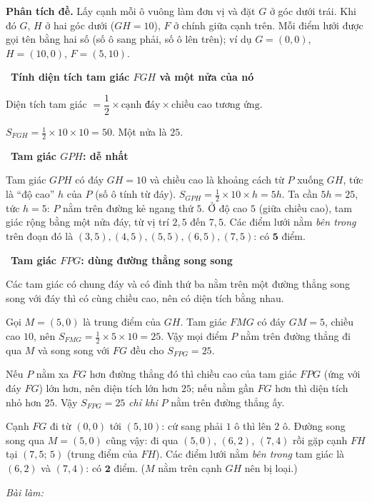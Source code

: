 \documentclass[11pt]{article}
\newif\ifsol \solfalse
\newcommand{\StuProb}[2]{\begin{probboxS}{#1}{#2}\StuProbBody\end{probboxS}}
\newcommand{\probsol}[1]{%
  \begin{lrbox}{\solmeasure}\begin{minipage}{\dimexpr\linewidth-24pt\relax}#1\end{minipage}\end{lrbox}%
  \ifsol
    \begin{solbox}#1\end{solbox}%
  \else
    \setlength{\solht}{\dimexpr\ht\solmeasure+\dp\solmeasure+0.85cm\relax}%
    \ifdim\solht<1.35cm\setlength{\solht}{1.35cm}\fi
    \ifdim\solht>\StudentMaxWork\setlength{\solht}{\StudentMaxWork}\fi
    \par\noindent\begin{minipage}{\linewidth}%
    \expandafter\StuProb\StuProbArgs
    \begin{tcolorbox}[colback=white,colframe=Line,boxrule=0.8pt,arc=5pt,
      left=8pt,right=8pt,top=4pt,bottom=4pt,height=\solht]{\footnotesize\color{Slate}\itshape\WorkWord}\end{tcolorbox}%
    \end{minipage}\par\medskip
  \fi}
\newlength{\StudentMaxWork}\setlength{\StudentMaxWork}{4.5cm}
\newcommand{\step}[2]{\par\smallskip\noindent{\bfseries\color{tmBlue!85!black}\StepWord~#1.}\ {\bfseries #2}\par\nopagebreak}
\def\WorkWord{Bài làm:}
\def\StepWord{Bước}
\begin{document}
\probsol{
\textbf{Phân tích đề.} Lấy cạnh mỗi ô vuông làm đơn vị và đặt $G$ ở góc dưới trái. Khi đó $G$, $H$ ở hai góc dưới
($GH=10$), $F$ ở chính giữa cạnh trên. Mỗi điểm lưới được gọi tên bằng hai số (số ô sang phải, số ô lên trên); ví dụ
$G=(0,0)$, $H=(10,0)$, $F=(5,10)$.

\step{1}{Tính diện tích tam giác $FGH$ và một nửa của nó}
\begin{recallbox}Diện tích tam giác $=\dfrac12\times\text{cạnh đáy}\times\text{chiều cao tương ứng}$.\end{recallbox}
$S_{FGH}=\frac12\times10\times10=50$. Một nửa là $25$.

\step{2}{Tam giác $GPH$: dễ nhất}
Tam giác $GPH$ có đáy $GH=10$ và chiều cao là khoảng cách từ $P$ xuống $GH$, tức là ``độ cao'' $h$ của $P$
(số ô tính từ đáy). $S_{GPH}=\frac12\times10\times h=5h$. Ta cần $5h=25$, tức $h=5$: $P$ nằm trên đường kẻ ngang
thứ $5$. Ở độ cao $5$ (giữa chiều cao), tam giác rộng bằng một nửa đáy, từ vị trí $2{,}5$ đến $7{,}5$. Các điểm lưới
nằm \emph{bên trong} trên đoạn đó là $(3,5),(4,5),(5,5),(6,5),(7,5)$: có $\mathbf{5}$ điểm.

\step{3}{Tam giác $FPG$: dùng đường thẳng song song}
\begin{recallbox}Các tam giác có chung đáy và có đỉnh thứ ba nằm trên một đường thẳng song song với đáy thì có
cùng chiều cao, nên có diện tích bằng nhau.\end{recallbox}
Gọi $M=(5,0)$ là trung điểm của $GH$. Tam giác $FMG$ có đáy $GM=5$, chiều cao $10$, nên $S_{FMG}=\frac12\times5\times10=25$.
Vậy mọi điểm $P$ nằm trên đường thẳng đi qua $M$ và song song với $FG$ đều cho $S_{FPG}=25$.
\begin{proofbox}Nếu $P$ nằm xa $FG$ hơn đường thẳng đó thì chiều cao của tam giác $FPG$ (ứng với đáy $FG$) lớn hơn, nên
diện tích lớn hơn $25$; nếu nằm gần $FG$ hơn thì diện tích nhỏ hơn $25$. Vậy $S_{FPG}=25$ \emph{chỉ khi} $P$ nằm trên
đường thẳng ấy.\end{proofbox}
Cạnh $FG$ đi từ $(0,0)$ tới $(5,10)$: cứ sang phải $1$ ô thì lên $2$ ô. Đường song song qua $M=(5,0)$ cũng vậy:
đi qua $(5,0)$, $(6,2)$, $(7,4)$ rồi gặp cạnh $FH$ tại $(7{,}5;\,5)$ (trung điểm của $FH$). Các điểm lưới nằm
\emph{bên trong} tam giác là $(6,2)$ và $(7,4)$: có $\mathbf{2}$ điểm. ($M$ nằm trên cạnh $GH$ nên bị loại.)

}
\end{document}

